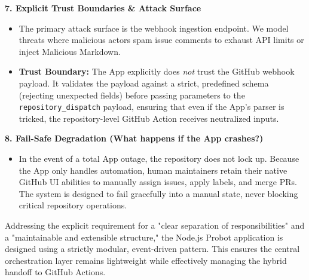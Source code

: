 \documentclass[11pt]{article}
\newcommand{\mainheading}[1]{\par\vspace{10pt}\noindent{\fontsize{15pt}{18pt}\selectfont\textcolor{headingblue}{#1}}
\par\vspace{4pt}}
\begin{document}
\vspace{5pt}
\noindent
\textbf{7. Explicit Trust Boundaries \& Attack Surface}
\begin{itemize}[leftmargin=18pt,itemsep=2pt,topsep=0pt]
\item The primary attack surface is the webhook ingestion endpoint. We model threats where malicious actors spam issue comments to exhaust API limits or inject Malicious Markdown.
\item \textbf{Trust Boundary:} The App explicitly does \textit{not} trust the GitHub webhook payload. It validates the payload against a strict, predefined schema (rejecting unexpected fields) before passing parameters to the \texttt{repository\_dispatch} payload, ensuring that even if the App's parser is tricked, the repository-level GitHub Action receives neutralized inputs.
\end{itemize}

\vspace{5pt}
\noindent
\textbf{8. Fail-Safe Degradation (What happens if the App crashes?)}
\begin{itemize}[leftmargin=18pt,itemsep=2pt,topsep=0pt]
\item In the event of a total App outage, the repository does not lock up. Because the App only handles automation, human maintainers retain their native GitHub UI abilities to manually assign issues, apply labels, and merge PRs. The system is designed to fail gracefully into a manual state, never blocking critical repository operations.
\end{itemize}



\mainheading{7. Target Production Architecture}

Addressing the explicit requirement for a "clear separation of responsibilities" and a "maintainable and extensible structure," the Node.js Probot application is designed using a strictly modular, event-driven pattern. This ensures the central orchestration layer remains lightweight while effectively managing the hybrid handoff to GitHub Actions.
\end{document}
